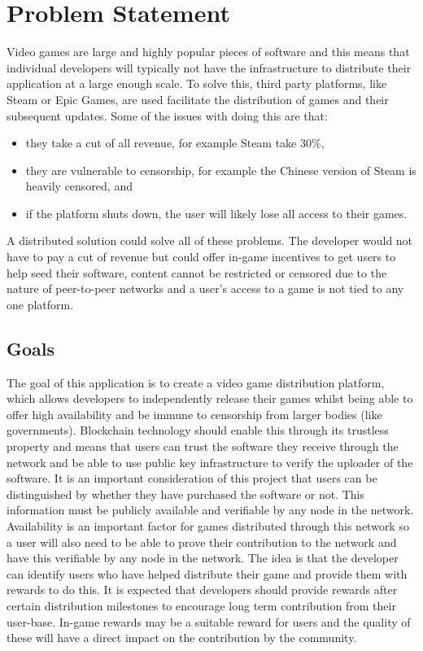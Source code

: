 
\chapter{Problem Statement}

Video games are large and highly popular pieces of software and this means that individual developers will typically not have the infrastructure to distribute their application at a large enough scale. To solve this, third party platforms, like Steam or Epic Games, are used facilitate the distribution of games and their subsequent updates. Some of the issues with doing this are that:

\begin{itemize}
  \item they take a cut of all revenue, for example Steam take 30\%,
  \item they are vulnerable to censorship, for example the Chinese version of Steam is heavily censored, and
  \item if the platform shuts down, the user will likely lose all access to their games.
\end{itemize}

\vspace{2mm}
\noindent A distributed solution could solve all of these problems. The developer would not have to pay a cut of revenue but could offer in-game incentives to get users to help seed their software, content cannot be restricted or censored due to the nature of peer-to-peer networks and a user's access to a game is not tied to any one platform.

\section{Goals}

The goal of this application is to create a video game distribution platform, which allows developers to independently release their games whilst being able to offer high availability and be immune to censorship from larger bodies (like governments). Blockchain technology should enable this through its trustless property and means that users can trust the software they receive through the network and be able to use public key infrastructure to verify the uploader of the software.
\x
It is an important consideration of this project that users can be distinguished by whether they have purchased the software or not. This information must be publicly available and verifiable by any node in the network.
\x
Availability is an important factor for games distributed through this network so a user will also need to be able to prove their contribution to the network and have this verifiable by any node in the network.
The idea is that the developer can identify users who have helped distribute their game and provide them with rewards to do this. It is expected that developers should provide rewards after certain distribution milestones to encourage long term contribution from their user-base.
In-game rewards may be a suitable reward for users and the quality of these will have a direct impact on the contribution by the community.

